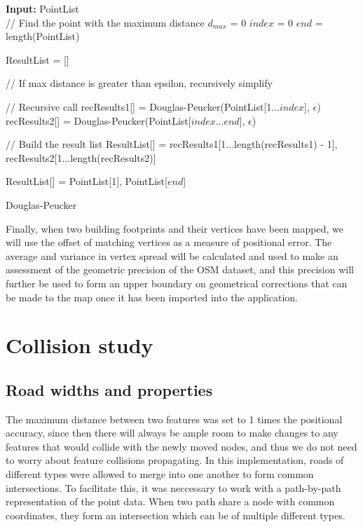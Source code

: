 \documentclass{kththesis}
\begin{document}
\begin{algorithm}[H]
\SetAlgoLined
{}
    \textbf{Input:} PointList\\
    // Find the point with the maximum distance\;
    $d_{max}$ = 0\;
    $index$ = 0\;
    $end$ = length(PointList)\;
    

    ResultList = []\;
    
    // If max distance is greater than epsilon, recursively simplify\;
     {
        // Recursive call\;
        recResults1[] = Douglas-Peucker(PointList[1...$index$], $\epsilon$)\;
        recResults2[] = Douglas-Peucker(PointList[$index$...$end$], $\epsilon$)\;

        // Build the result list\;
        ResultList[] = {recResults1[1...length(recResults1) - 1], recResults2[1...length(recResults2)]}\;
    }{
        ResultList[] = {PointList[1], PointList[$end$]}\;
    }
    \;

    \caption{Douglas-Peucker}
\end{algorithm}

Finally, when two building footprints and their vertices have been mapped, we will use the offset of matching vertices as a measure of positional error. The average and variance in vertex spread will be calculated and used to make an assessment of the geometric precision of the OSM dataset, and this precision will further be used to form an upper boundary on geometrical corrections that can be made to the map once it has been imported into the application.

\section{Collision study}

\subsection{Road widths and properties}

The maximum distance between two features was set to 1 times the positional accuracy, since then there will always be ample room to make changes to any features that would collide with the newly moved nodes, and thus we do not need to worry about feature collisions propagating.
In this implementation, roads of different types were allowed to merge into one another to form common intersections.
To facilitate this, it was neccessary to work with a path-by-path representation of the point data.
When two path share a node with common coordinates, they form an intersection which can be of multiple different types.
\end{document}
